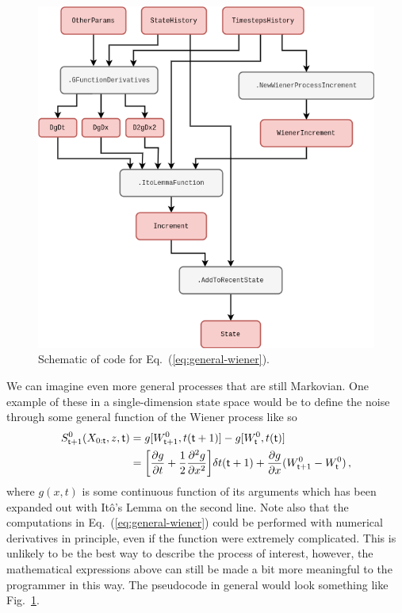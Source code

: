 \begin{figure}[h]
\centering
\includegraphics[width=12cm]{images/chapter-1-ito-lemma.drawio.png}
\caption{Schematic of code for Eq.~(\ref{eq:general-wiener}).}
\label{fig:ito-lemma}
\end{figure}

We can imagine even more general processes that are still Markovian. One example of these in a single-dimension state space would be to define the noise through some general function of the Wiener process like so
\begin{align}
S^0_{{\sf t}+1}(X_{0:{\sf t}},z,{\sf t}) &= g[W^0_{{\sf t}+1},t({\sf t}+1)]-g[W^0_{\sf t}, t({\sf t})] \\
&= \bigg[ \frac{\partial g}{\partial t} + \frac{1}{2}\frac{\partial^2 g}{\partial x^2} \bigg] \delta t ({\sf t}+1) + \frac{\partial g}{\partial x} (W^0_{{\sf t}+1}-W^0_{\sf t}) \label{eq:general-wiener}\,,
\end{align}
where $g(x,t)$ is some continuous function of its arguments which has been expanded out with Itô's Lemma on the second line. Note also that the computations in Eq.~(\ref{eq:general-wiener}) could be performed with numerical derivatives in principle, even if the function were extremely complicated. This is unlikely to be the best way to describe the process of interest, however, the mathematical expressions above can still be made a bit more meaningful to the programmer in this way. The pseudocode in general would look something like Fig.~\ref{fig:ito-lemma}.

